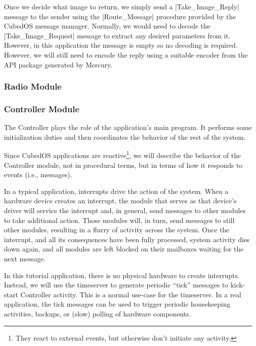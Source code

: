 Once we decide what image to return, we simply send a |Take_Image_Reply| message to the sender
using the |Route_Message| procedure provided by the CubedOS message manager. Normally, we would
need to decode the |Take_Image_Request| message to extract any desired parameters from it.
However, in this application the message is empty so no decoding is required. However, we will
still need to encode the reply using a suitable encoder from the API package generated by
Mercury.

\subsubsection{Radio Module}




\subsubsection{Controller Module}

The Controller plays the role of the application's main program. It performs some initialization
duties and then coordinates the behavior of the rest of the system.

Since CubedOS applications are reactive\footnote{They react to external events, but otherwise
don't initiate any activity.}, we will describe the behavior of the Controller module, not in
procedural terms, but in terms of how it responds to events (i.e., messages).

In a typical application, interrupts drive the action of the system. When a hardware device
creates an interrupt, the module that serves as that device's driver will service the interrupt
and, in general, send messages to other modules to take additional action. Those modules will,
in turn, send messages to still other modules, resulting in a flurry of activity across the
system. Once the interrupt, and all its consequences have been fully processed, system activity
dies down again, and all modules are left blocked on their mailboxes waiting for the next
message.

In this tutorial application, there is no physical hardware to create interrupts. Instead, we
will use the timeserver to generate periodic ``tick'' messages to kick-start Controller
activity. This is a normal use-case for the timeserver. In a real application, the tick messages
can be used to trigger periodic housekeeping activities, backups, or (slow) polling of hardware
components.

